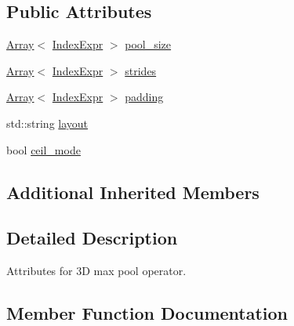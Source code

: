 \subsection*{Public Attributes}
\begin{DoxyCompactItemize}
\item 
\hyperlink{classtvm_1_1Array}{Array}$<$ \hyperlink{namespacetvm_1_1relay_ae153a27d81399fd266b8d598227764c4}{Index\+Expr} $>$ \hyperlink{structtvm_1_1relay_1_1MaxPool3DAttrs_a82691187858d9ecc11176b6195fc97c4}{pool\+\_\+size}
\item 
\hyperlink{classtvm_1_1Array}{Array}$<$ \hyperlink{namespacetvm_1_1relay_ae153a27d81399fd266b8d598227764c4}{Index\+Expr} $>$ \hyperlink{structtvm_1_1relay_1_1MaxPool3DAttrs_a8cf3ac4fe2048ec78f8b7b8bb80f65ce}{strides}
\item 
\hyperlink{classtvm_1_1Array}{Array}$<$ \hyperlink{namespacetvm_1_1relay_ae153a27d81399fd266b8d598227764c4}{Index\+Expr} $>$ \hyperlink{structtvm_1_1relay_1_1MaxPool3DAttrs_af80ff276969ce1fa8ee324204a93edaf}{padding}
\item 
std\+::string \hyperlink{structtvm_1_1relay_1_1MaxPool3DAttrs_a6e9c6764b368c426831d52c51f3e8c61}{layout}
\item 
bool \hyperlink{structtvm_1_1relay_1_1MaxPool3DAttrs_a6a5bb2bda2cb0b5654987cd08d74c64a}{ceil\+\_\+mode}
\end{DoxyCompactItemize}
\subsection*{Additional Inherited Members}


\subsection{Detailed Description}
Attributes for 3D max pool operator. 

\subsection{Member Function Documentation}
